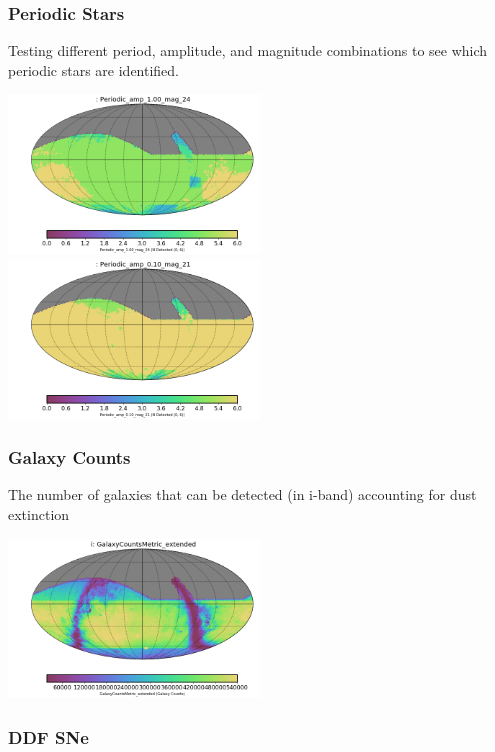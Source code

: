 \subsubsection{Periodic Stars}

Testing different period, amplitude, and magnitude combinations to see which periodic stars are identified.

\includegraphics[width=0.5\textwidth]{metric_summary/sci_baseline_v1.4_10yrs/thumb._Periodic_amp_1_00_mag_24_HEAL_SkyMap.png}
\includegraphics[width=0.5\textwidth]{metric_summary/sci_baseline_v1.4_10yrs/thumb._Periodic_amp_0_10_mag_21_HEAL_SkyMap.png}

\subsubsection{Galaxy Counts}

The number of galaxies that can be detected (in i-band) accounting for dust extinction

\includegraphics[width=0.5\textwidth]{metric_summary/sci_baseline_v1.4_10yrs/thumb._GalaxyCountsMetric_extended_i_HEAL_SkyMap.png}

\subsubsection{DDF SNe}

